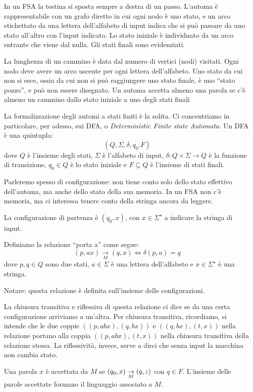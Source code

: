 In un FSA la testina si sposta sempre a destra di un passo.
L'automa \`e rappresentabile con un grafo diretto in cui ogni nodo \`e uno stato, e un arco etichettato da una lettera dell'alfabeto di input  indica che si pu\`o passare da uno stato all'altro con l'input indicato.
Lo stato iniziale \`e individuato da un arco entrante che viene dal nulla.
Gli stati finali sono evidenziati.

La lunghezza di un cammino \`e data dal numero di vertici (nodi) visitati.
Ogni nodo deve avere un arco uscente per ogni lettera dell'alfabeto.
Uno stato da cui non si esce, ossia da cui non si pu\`o raggiungere uno stato finale, \`e uno ``stato pozzo'', e pu\`o non essere disegnato.
Un automa accetta almeno una parola se c'\`e almeno un cammino dallo stato iniziale a uno degli stati finali

La formalizzazione degli automi a stati finiti \`e la solita.
Ci concentriamo in particolare, per adesso, sui DFA, o \emph{Deterministic Finite state Automata}.
Un DFA \`e una quintupla:
\[
	(Q, \Sigma, \delta, q_0. F)
\]
dove $Q$ \`e l'insieme degli stati, $\Sigma$ \`e l'alfabeto di input, $\delta : Q \times \Sigma \to Q$ \`e la funzione di transizione, $q_0 \in Q$ \`e lo stato iniziale e $F \subseteq Q$ \`e l'insieme di stati finali.

Parleremo spesso di configurazione: non tiene conto solo dello stato effettivo dell'automa, ma anche dello stato della sua memoria.
In un FSA non c'\`e memoria, ma ci interessa tenere conto della stringa ancora da leggere.

La configurazione di partenza \`e $(q_0, x)$, con $x \in \Sigma^{\star}$ a indicare la stringa di input.

Definiamo la relazione ``porta a'' come segue:
\[
	(p, ax) \underset{M}{\to} (q,x) \iff \delta(p,a) = q
\]
dove $p,q \in Q$ sono due stati, $a \in \Sigma$ \`e una lettera dell'alfabeto e $x \in \Sigma^{\star}$ \`e una stringa.

Notare: questa relazione \`e definita sull'insieme delle configurazioni.

La chiusura transitiva e riflessiva di questa relazione ci dice se da una certa configurazione arriviamo a un'altra.
Per chiusura transitiva, ricordiamo, si intende che le due coppie $((p, abx), (q,bx))$ e $((q,bx),(t,x))$ nella relazione portano alla coppia $((p,abx),(t,x))$ nella chiusura transitiva della relazione stessa.
La riflessivit\`a, invece, serve a dirci che senza input la macchina non cambia stato.

Una parola $x$ \`e accettata da $M$ se $(q_0, x) \underset{M}{\to} (q,\varepsilon)$ con $q \in F$.
L'insieme delle parole accettate formano il linguaggio associato a $M$.

